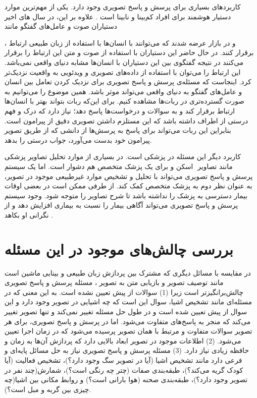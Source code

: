 	کاربردهای بسیاری برای پرسش و پاسخ تصویری وجود دارد. یکی از مهم‌ترین موارد دستیار هوشمند برای افراد کم‌بینا و نابینا  است
	\cite{gurari2018vizwiz}.
	علاوه بر این، در سال های اخیر دستیاران صوت
   و عامل‌های گفتگو
     مانند  
     
	،
و
	در بازار عرضه شدند که می‌توانند با انسان‌ها با استفاده از زبان طبیعی ارتباط برقرار کنند. در حال حاضر این دستیاران با استفاده از صوت و متن این ارتباط را برقرار می‌کنند در نتیجه گفتگوی بین این دستیاران با انسان‌ها مشابه دنیای واقعی نمی‌باشد. این ارتباط را می‌توان با استفاده از داده‌های تصویری و ویدئویی به واقعیت نزدیک‌تر کرد. اینجاست که مسئله‌ی پرسش و پاسخ تصویری برای نزدیک کردن تعامل بین انسان و عامل‌های گفتگو به دنیای واقعی می‌تواند موثر باشد.  همین موضوع را می‌توانیم به صورت گسترده‌تری در ربات‌ها مشاهده کنیم. برای این‌که ربات بتواند بهتر با انسان‌ها ارتباط برقرار کند و به سوالات و درخواست‌ها پاسخ دهد؛ نیاز دارد که درک و فهم درستی از اطراف داشته باشد که این مستلزم داشتن تصویری دقیق از پیرامون است. بنابراین این ربات می‌تواند برای پاسخ به پرسش‌ها از دانشی که از طریق تصویر پیرامون خود بدست می‌آورد، جواب درستی را بدهد. 
  
  کاربرد دیگر این مسئله در پزشکی است. در بسیاری از موارد تحلیل تصاویر پزشکی مانند تصاویر
   ‌ اسکن و 
   برای یک پزشک متخصص هم دشوار است. اما یک سیستم پرسش و پاسخ تصویری می‌تواند با تحلیل و تشخیص موارد غیرطبیعی موجود در تصویر، به عنوان نظر دوم به پزشک متخصص کمک کند. از طرفی ممکن است در بعضی اوقات بیمار دسترسی به پزشک را نداشته باشد تا شرح تصاویر را متوجه شود. وجود سیستم پرسش و پاسخ تصویری می‌تواند آگاهی بیمار را نسبت به بیماری افزایش دهد و از نگرانی او بکاهد
   \cite{talafha2018just}.

\section{بررسی چالش‌های موجود در این مسئله}
	در مقایسه با مسائل دیگری که مشترک بین پردازش زبان طبیعی و بینایی ماشین است مانند توصیف تصویر
	و بازیابی متن به تصویر
	، مسئله پرسش و پاسخ تصویری چالش‌برانگیزتر است زیرا (1)  سوالات از پیش تعیین نشده است. به این معنی که در مسئله‌ای مانند تشخیص اشیا، سوال این است که چه اشیایی در تصویر وجود دارد و این سوال از پیش تعیین شده است و در طول حل مسئله تغییر نمی‌کند و تنها تصویر تغییر می‌کند که منجر به پاسخ‌های متفاوت می‌شود. اما در پرسش و پاسخ تصویری، برای هر تصویر سوالات متفاوت و مرتبط با همان تصویر پرسیده می‌شود که در زمان اجرا تعیین می‌شود. (2) اطلاعات موجود در تصویر ابعاد بالایی دارد که پردازش آن‌ها به زمان و حافظه زیادی نیاز دارد. (3) مسئله پرسش و پاسخ تصویری نیاز به حل مسائل پایه‌ای  و فرعی دارد مانند تشخیص اشیا
	(آیا در تصویر سگ وجود دارد؟)، تشخیص فعالیت
	(آیا کودک گریه می‌کند؟)، طبقه‌بندی صفات
	(چتر چه رنگی است؟)، شمارش(چند نفر در تصویر وجود دارد؟)، طبقه‌بندی صحنه
	(هوا بارانی است؟) و روابط مکانی بین اشیا(چه چیزی بین گربه و مبل است؟).

